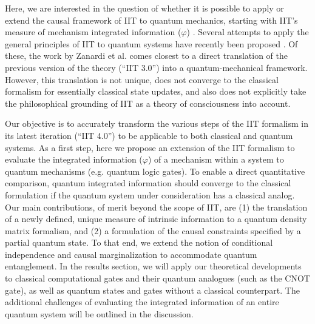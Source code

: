 \documentclass[preprints, article, accept, pdftex, moreauthors, letterpaper]{Definitions/mdpi}
\renewcommand{\=}[1]{\stackrel{#1}{=}} %
\renewcommand{\*}{\otimes}%
\begin{document}
Here, we are interested in the question of whether it is possible to apply or extend the causal framework of IIT to quantum mechanics, starting with IIT's measure of mechanism integrated information ($\varphi$) \cite{Barbosa2021, Albantakis2022_4_0}. Several attempts to apply the general principles of IIT to quantum systems have recently been proposed \cite{Tegmark2015, Zanardi2018, Kleiner2021}. Of these, the work by Zanardi et al. \cite{Zanardi2018} comes closest to a direct translation of the previous version of the theory (``IIT 3.0'') \cite{Oizumi2014} into a quantum-mechanical framework. However, this translation is not unique, does not converge to the classical formalism for essentially classical state updates, and also does not explicitly take the philosophical grounding of IIT as a theory of consciousness into account. 

Our objective is to accurately transform the various steps of the IIT formalism in its latest iteration (``IIT 4.0'') \cite{Barbosa2021, Albantakis2022_4_0} to be applicable to both classical and quantum systems. As a first step, here we propose an extension of the IIT formalism to evaluate the integrated information ($\varphi$) of a mechanism within a system \cite{Barbosa2021} to quantum mechanisms (e.g. quantum logic gates). To enable a direct quantitative comparison, quantum integrated information should converge to the classical formulation if the quantum system under consideration has a classical analog. 
Our main contributions, of merit beyond the scope of IIT, are (1) the translation of a newly defined, unique measure of intrinsic information \cite{Barbosa2020, Barbosa2021} to a quantum density matrix formalism, and (2) a formulation of the causal constraints specified by a partial quantum state. To that end, we extend the notion of conditional independence and causal marginalization \cite{Albantakis2019} to accommodate quantum entanglement. 
In the results section, we will apply our theoretical developments to classical computational gates and their quantum analogues (such as the CNOT gate), as well as quantum states and gates without a classical counterpart. 
The additional challenges of evaluating the integrated information of an entire quantum system will be outlined in the discussion. %
\end{document}
